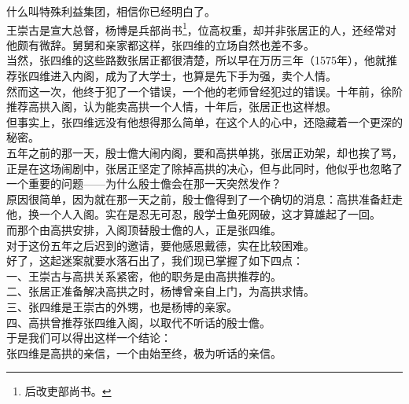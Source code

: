 \begin{multicols}{\theparacolNo}
什么叫特殊利益集团，相信你已经明白了。\\

王崇古是宣大总督，杨博是兵部尚书\footnote{后改吏部尚书。}，位高权重，却并非张居正的人，还经常对他颇有微辞。舅舅和亲家都这样，张四维的立场自然也差不多。\\

当然，张四维的这些路数张居正都很清楚，所以早在万历三年（1575年），他就推荐张四维进入内阁，成为了大学士，也算是先下手为强，卖个人情。\\

然而这一次，他终于犯了一个错误，一个他的老师曾经犯过的错误。十年前，徐阶推荐高拱入阁，认为能卖高拱一个人情，十年后，张居正也这样想。\\

但事实上，张四维远没有他想得那么简单，在这个人的心中，还隐藏着一个更深的秘密。\\

五年之前的那一天，殷士儋大闹内阁，要和高拱单挑，张居正劝架，却也挨了骂，正是在这场闹剧中，张居正坚定了除掉高拱的决心，但与此同时，他似乎也忽略了一个重要的问题——为什么殷士儋会在那一天突然发作？\\

原因很简单，因为就在那一天之前，殷士儋得到了一个确切的消息：高拱准备赶走他，换一个人入阁。实在是忍无可忍，殷学士鱼死网破，这才算雄起了一回。\\

而那个由高拱安排，入阁顶替殷士儋的人，正是张四维。\\

对于这份五年之后迟到的邀请，要他感恩戴德，实在比较困难。\\

好了，这起迷案就要水落石出了，我们现已掌握了如下四点：\\

一、王崇古与高拱关系紧密，他的职务是由高拱推荐的。\\

二、张居正准备解决高拱之时，杨博曾亲自上门，为高拱求情。\\

三、张四维是王崇古的外甥，也是杨博的亲家。\\

四、高拱曾推荐张四维入阁，以取代不听话的殷士儋。\\

于是我们可以得出这样一个结论：\\

张四维是高拱的亲信，一个由始至终，极为听话的亲信。\\


\end{multicols}
